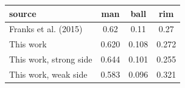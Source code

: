 \begin{tabular}{lccc}
\hline
source & man & ball & rim \\
\hline
Franks et al. (2015) & 0.62 & 0.11 & 0.27 \\
This work & 0.620 & 0.108 & 0.272 \\
This work, strong side & 0.644 & 0.101 & 0.255 \\
This work, weak side & 0.583 & 0.096 & 0.321 \\
\hline
\end{tabular}
